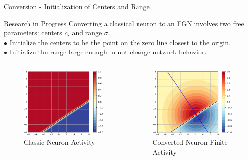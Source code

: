 \documentclass{beamer}
\begin{document}
\begin{frame}{Conversion - Initialization of Centers and Range}
    \begin{block}{Research in Progress}
    Converting a classical neuron to an FGN involves two free parameters: centers $c_i$ and range $\sigma$.\\
    $\bullet$ Initialize the centers to be the point on the zero line closest to the origin.\\
    $\bullet$ Initialize the range large enough to not change network behavior.
    \end{block}
    
    \begin{columns}
    \begin{column}{.5\textwidth}
    \begin{figure}
        \includegraphics[width=.8\textwidth]{images/2D-Conversion/classic-act.png}
        \caption*{Classic Neuron Activity}
    \end{figure}
    \end{column}
    \begin{column}{.5\textwidth}
    \begin{figure}
        \includegraphics[width=.8\textwidth]{images/2D-Conversion/converted-act.png}
        \caption*{Converted Neuron Finite Activity}
    \end{figure}
    \end{column}
    \end{columns}
    
\end{frame}
\end{document}
